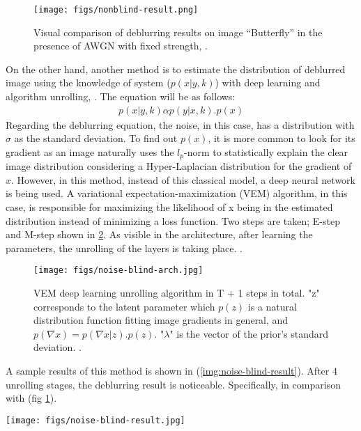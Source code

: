 \documentclass[conference, 11pt]{IEEEtran}
\begin{document}
	
	\begin{figure}[!htbp]
		\texttt{[image: figs/nonblind-result.png]}
		\centering
		\caption{Visual comparison of deblurring results on image “Butterfly” in the presence of AWGN with fixed strength, \cite{Quan2021}.
			\label{img:nonblind-result}}
	\end{figure}
	
	On the other hand, another method is to estimate the distribution of deblurred image using the knowledge of system (\(p(x|y, k)\)) with deep learning and algorithm unrolling, \cite{Nan2020}. The equation will be as follows:
	\begin{align}
		p(x|y, k) \alpha p(y|x, k).p(x)
	\end{align}
	Regarding the deblurring equation, the noise, in this case, has a distribution with $\sigma$ as the standard deviation. To find out \(p(x)\), it is more common to look for its gradient as an image naturally uses the \(l_p\)-norm to statistically explain the clear image distribution considering a Hyper-Laplacian distribution for the gradient of \(x\). However, in this method, instead of this classical model, a deep neural network is being used. A variational expectation-maximization (VEM) algorithm, in this case, is responsible for maximizing the likelihood of x being in the estimated distribution instead of minimizing a loss function. Two steps are taken; E-step and M-step shown in \ref{img:noise-blind-arch}. As visible in the architecture, after learning the parameters, the unrolling of the layers is taking place. \cite{Nan2020}. 
	
	\begin{figure}[!htbp]
		\texttt{[image: figs/noise-blind-arch.jpg]}
		\centering
		\caption{VEM deep learning unrolling algorithm in
			T + 1 steps in total. "z" corresponds to the latent parameter which \(p(z)\) is a natural distribution function fitting image gradients in general, and  \(p(\nabla{x})=p(\nabla{x}|z).p(z)\). "$\lambda$" is the vector of the prior's standard deviation. \cite{Nan2020}.}	
		\label{img:noise-blind-arch}
	\end{figure}
	
	A sample results of this method is shown in (\ref{img:noise-blind-result}). After 4 unrolling stages, the deblurring result is noticeable. Specifically, in comparison with (fig \ref{img:nonblind-result}).
	
	\begin{figure*}
		\texttt{[image: figs/noise-blind-result.jpg]}
		\centering
		\caption{Visualization of intermediate results from different stages of the proposed NN, with PSNR values \cite{Nan2020}.}
		\label{img:noise-blind-result}
	\end{figure*}
	
\end{document}
